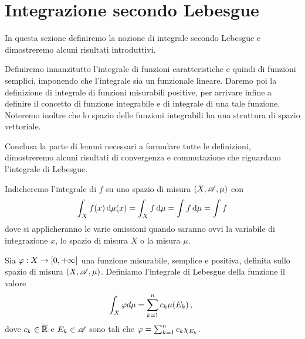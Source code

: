 \section{Integrazione secondo Lebesgue}
In questa sezione definiremo la nozione di integrale secondo Lebesgue e dimostreremo alcuni risultati introduttivi.

Definiremo innanzitutto l'integrale di funzioni caratteristiche e quindi di funzioni semplici, imponendo che l'integrale sia un funzionale lineare. Daremo poi la definizione di integrale di funzioni misurabili positive, per arrivare infine a definire il concetto di funzione integrabile e di integrale di una tale funzione. Noteremo inoltre che lo spazio delle funzioni integrabili ha una struttura di spazio vettoriale.

Conclusa la parte di lemmi necessari a formulare tutte le definizioni, dimostreremo alcuni risultati di convergenza e commutazione che riguardano l'integrale di Lebesgue.

\begin{remark}
	Indicheremo l'integrale di $f$ su uno spazio di misura $(X,\mathscr A,\mu)$ con 
	\begin{equation*}
		\int_X f(x) \,\mathrm d \mu(x)=\int_X f \,\mathrm d \mu=\int f \,\mathrm d \mu=\int f
	\end{equation*}
	dove si applicheranno le varie omissioni quando saranno ovvi la variabile di integrazione $x$, lo spazio di misura $X$ o la misura $\mu$.
\end{remark}

\begin{definition}\label{def:IntegraleSemplici}
	Sia $\varphi:X\to [0,+\infty]$ una funzione misurabile, semplice e positiva, definita sullo spazio di misura $(X,\mathscr A,\mu)$. Definiamo l'integrale di Lebesgue della funzione il valore
	\begin{equation*}
		\int_X \varphi d \mu = \sum_{k=1}^n c_k\mu(E_k)\, \text{, }
	\end{equation*}
	dove $c_k\in \overline{\mathbb R}$ e $E_k \in \mathscr A$ sono tali che $\varphi=\sum_{k=1}^nc_k\chi_{E_k}$.
\end{definition}

